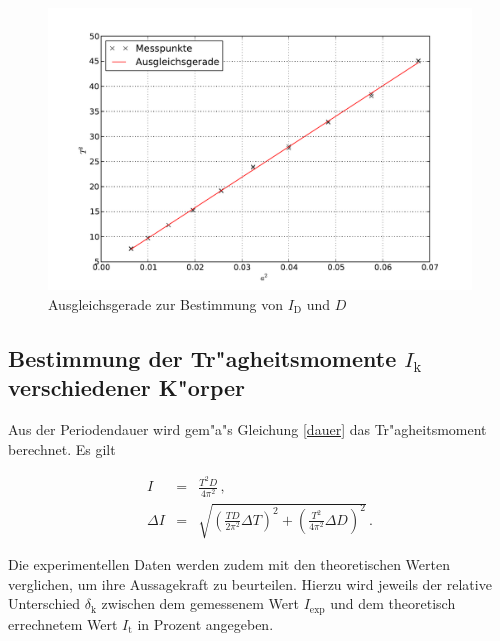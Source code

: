 		\begin{figure}[h!]
			\centering
			\includegraphics[width = 15cm]{img/graph2_T.pdf}
			\caption{Ausgleichsgerade zur Bestimmung von $I_\mathrm{D}$ und $D$}
			\label{fig:graph2}
		\end{figure}

		\subsection{Bestimmung der Tr"agheitsmomente $I_\mathrm{k}$ verschiedener K"orper}
		\label{subsec:versch_momente}

			Aus der Periodendauer wird gem"a"s Gleichung \eqref{dauer} das Tr"agheitsmoment berechnet.
			Es gilt

			\begin{eqnarray*}
				I & = & \frac{T^2 D}{4 \pi^2} \,, \\
				\Delta I & = & \sqrt{\left(\frac{TD}{2 \pi^2} \Delta T\right)^2 + \left(\frac{T^2}{4 \pi^2} \Delta D\right)^2} \,.
			\end{eqnarray*}

			Die experimentellen Daten werden zudem mit den theoretischen Werten verglichen, um ihre Aussagekraft zu beurteilen.
			Hierzu wird jeweils der relative Unterschied $\delta_\mathrm{k}$ zwischen dem gemessenem Wert $I_\mathrm{exp}$ und dem theoretisch errechnetem Wert $I_\mathrm{t}$ in Prozent angegeben.

			\clearpage
